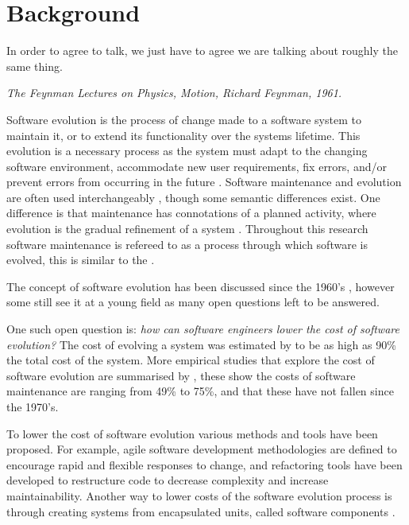 \chapter{Background}
\label{background}
\epigraph{
In order to agree to talk, we just have to agree we are talking about roughly the same thing.
}
{\textit{The Feynman Lectures on Physics, Motion, Richard Feynman, 1961.}}

Software evolution \citep{lehman1980} is the process of change made to a software system to maintain it, or to extend its functionality over the systems lifetime.
This evolution is a necessary process as the system must adapt to the changing software environment, accommodate new user requirements, 
fix errors, and/or prevent errors from occurring in the future \citep{IsoIec2006}.
Software maintenance and evolution are often used interchangeably \citep{Godfrey2008}, though some semantic differences exist.
One difference is that maintenance has connotations of a planned activity, where evolution is the gradual refinement of a system \cite{lehman1980}.
Throughout this research software maintenance is refereed to as a process through which software is evolved, this is similar to the .

The concept of software evolution has been discussed since the 1960's \citep{Lehman1969}, 
however some still see it at a young field \citep{Godfrey2008} as many open questions left to be answered.

One such open question is: \textit{how can software engineers lower the cost of software evolution?}
The cost of evolving a system was estimated by \cite{Brooks1975} to be as high as 90\% the total cost of the system.
More empirical studies that explore the cost of software evolution are summarised by \cite{Grubb2003}, these show the costs of software maintenance are ranging from 49\% to 75\%, 
and that these have not fallen since the 1970's. 

To lower the cost of software evolution various methods and tools have been proposed.
For example, agile software development \citep{beck2001manifesto} methodologies are defined to encourage rapid and flexible responses to change,
and refactoring tools \citep{fowler1999refactoring} have been developed to restructure code to decrease complexity and increase maintainability. 
Another way to lower costs of the software evolution process is through creating systems from encapsulated units, called software components \citep{Szyperski2002}.

